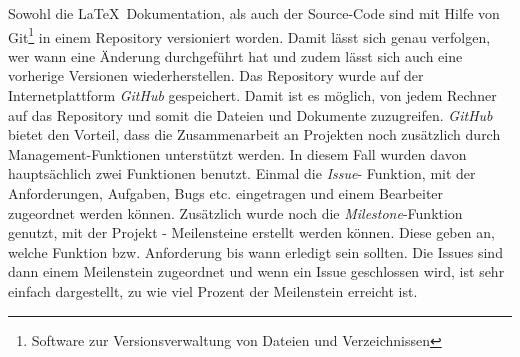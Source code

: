 Sowohl die \LaTeX\ Dokumentation, als auch der Source-Code sind mit Hilfe von Git\footnote{Software zur Versionsverwaltung von Dateien und Verzeichnissen}  in einem Repository versioniert worden. Damit lässt sich genau verfolgen, wer wann eine Änderung durchgeführt hat und zudem lässt sich auch eine vorherige Versionen wiederherstellen.
Das Repository wurde auf der Internetplattform \textit{GitHub}  gespeichert. Damit ist es möglich, von jedem Rechner auf das Repository und somit die Dateien und Dokumente zuzugreifen. \textit{GitHub} bietet den Vorteil, dass die Zusammenarbeit an Projekten noch zusätzlich durch Management-Funktionen unterstützt werden. In diesem Fall wurden davon hauptsächlich zwei Funktionen benutzt. Einmal die \textit{Issue}- Funktion, mit der Anforderungen, Aufgaben, Bugs etc. eingetragen und einem Bearbeiter zugeordnet werden können. Zusätzlich wurde noch die \textit{Milestone}-Funktion genutzt, mit der Projekt - Meilensteine erstellt werden können. Diese geben an, welche Funktion bzw. Anforderung bis wann erledigt sein sollten. Die Issues sind dann einem Meilenstein zugeordnet und wenn ein Issue geschlossen wird, ist sehr einfach dargestellt, zu wie viel Prozent der Meilenstein erreicht ist.
